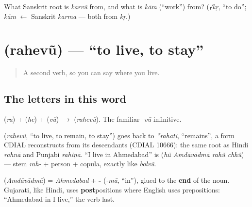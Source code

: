 \begin{tcolorbox}[breakable,colback=teal!4,colframe=teal!35!black,title={Before you move on}]
What Sanskrit root is \emph{karvũ} from, and what is \emph{kām} (\textquotedblleft{}work\textquotedblright{}) from? (\emph{√kṛ}, \textquotedblleft{}to do\textquotedblright{}; \emph{kām} $\leftarrow$ Sanskrit \emph{karma} — both from \emph{kṛ}.)
\end{tcolorbox}
\section[\texorpdfstring{\gu{રહેવું} (rahevũ)}{રહેવું (rahevũ)}]{ (rahevũ) — \textquotedblleft{}to live, to stay\textquotedblright{}}

\label{lesson:GU-C05-rahevun}



\begin{quote}
A second verb, so you can say where you live.
\end{quote}

\subsection*{The letters in this word}
\textbf{} (\emph{ra}) + \textbf{} (\emph{he}) + \textbf{} (\emph{vũ}) $\to$ \textbf{} (\emph{rahevũ}). The familiar \emph{-vũ} infinitive.

\begin{cousinweb}
\textbf{} (\emph{rahevũ}, \textquotedblleft{}to live, to remain, to stay\textquotedblright{}) goes back to \emph{*rahati}, \textquotedblleft{}remains\textquotedblright{}, a form CDIAL reconstructs from its descendants (CDIAL 10666): the same root as Hindi \emph{rahnā} and Punjabi \emph{rahiṇā}. \textquotedblleft{}I live in Ahmedabad\textquotedblright{} is \textbf{   } (\emph{hũ Amdāvādmā rahũ chhũ}) — stem \emph{rah-} + person + copula, exactly like \emph{bolvũ}.
\end{cousinweb}

\begin{grammarlens}[title={Grammar Lens: \textquotedblleft{}in\textquotedblright{} comes after the noun}]
\textbf{} (\emph{Amdāvādmā}) = \emph{Ahmedabad} + \textbf{-} (\emph{-mā}, \textquotedblleft{}in\textquotedblright{}), glued to the \textbf{end} of the noun. Gujarati, like Hindi, uses \textbf{post}positions where English uses prepositions: \textquotedblleft{}Ahmedabad-in I live,\textquotedblright{} the verb last.
\end{grammarlens}

